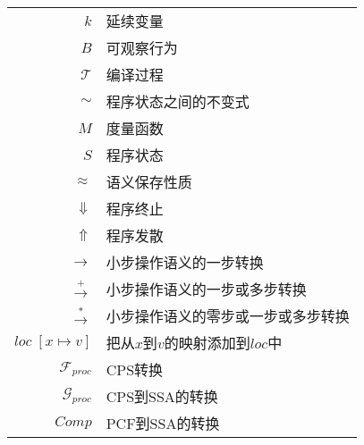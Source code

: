 
\begin{nomenclature*}
\label{chap:symb}

\begin{longtable}{rl}
  $k$  & 延续变量  \\  
  $B$       & 可观察行为    \\
  $\mathcal{T}$  & 编译过程  \\
  $\sim$       & 程序状态之间的不变式    \\
  $M$  & 度量函数  \\
  $S$       & 程序状态    \\
  $\approx$       & 语义保存性质    \\
  $\Downarrow$  & 程序终止  \\
  $\Uparrow$       & 程序发散    \\
  $\rightarrow$  & 小步操作语义的一步转换  \\
  $\xrightarrow{+}$       & 小步操作语义的一步或多步转换    \\
  $\xrightarrow{*}$  & 小步操作语义的零步或一步或多步转换  \\
  $loc\; [x\mapsto v]$ & 把从$x$到$v$的映射添加到$loc$中  \\
  $\mathcal{F}_{proc}$  & CPS转换  \\
  $\mathcal{G}_{proc}$  & CPS到SSA的转换  \\
  $Comp$  & PCF到SSA的转换  \\
\end{longtable}

\end{nomenclature*}
